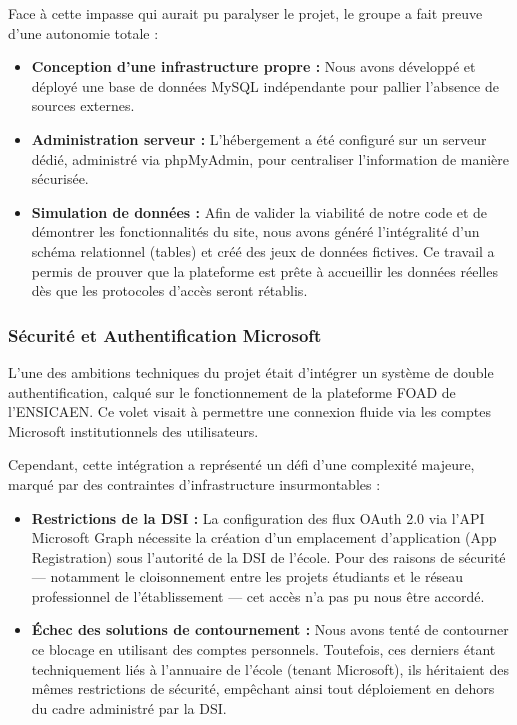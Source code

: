 \documentclass[a4paper,12pt]{article}
\begin{document}
Face à cette impasse qui aurait pu paralyser le projet, le groupe a fait preuve d'une autonomie totale :
\begin{itemize}[label=\textbullet, itemsep=5pt]
    \item \textbf{Conception d'une infrastructure propre :} Nous avons développé et déployé une base de données MySQL indépendante pour pallier l'absence de sources externes.
    \item \textbf{Administration serveur :} L'hébergement a été configuré sur un serveur dédié, administré via phpMyAdmin, pour centraliser l'information de manière sécurisée.
    \item \textbf{Simulation de données :} Afin de valider la viabilité de notre code et de démontrer les fonctionnalités du site, nous avons généré l'intégralité d'un schéma relationnel (tables) et créé des jeux de données fictives. Ce travail a permis de prouver que la plateforme est prête à accueillir les données réelles dès que les protocoles d'accès seront rétablis.
\end{itemize}

\subsubsection{Sécurité et Authentification Microsoft}
L'une des ambitions techniques du projet était d'intégrer un système de double authentification, calqué sur le fonctionnement de la plateforme FOAD de l’ENSICAEN. Ce volet visait à permettre une connexion fluide via les comptes Microsoft institutionnels des utilisateurs.

Cependant, cette intégration a représenté un défi d'une complexité majeure, marqué par des contraintes d'infrastructure insurmontables :
\begin{itemize}[label=\textbullet, itemsep=5pt]
    \item \textbf{Restrictions de la DSI :} La configuration des flux OAuth 2.0 via l'API Microsoft Graph nécessite la création d'un emplacement d'application (App Registration) sous l'autorité de la DSI de l'école. Pour des raisons de sécurité — notamment le cloisonnement entre les projets étudiants et le réseau professionnel de l'établissement — cet accès n'a pas pu nous être accordé.
    \item \textbf{Échec des solutions de contournement :} Nous avons tenté de contourner ce blocage en utilisant des comptes personnels. Toutefois, ces derniers étant techniquement liés à l'annuaire de l'école (tenant Microsoft), ils héritaient des mêmes restrictions de sécurité, empêchant ainsi tout déploiement en dehors du cadre administré par la DSI.
\end{itemize}
\end{document}
